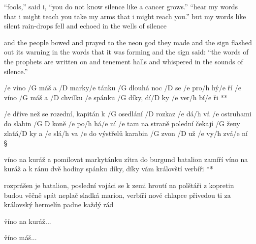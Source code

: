 ``fools,'' said i, ``you do not know
silence like a cancer grows.''
``hear my words that i might teach you
take my arms that i might reach you.''
but my words like silent rain-drops fell
and echoed in the wells of silence \s

and the people bowed and prayed
to the neon god they made
and the sign flashed out its warning
in the words that it was forming
and the sign said: ``the words of the prophets are written on 
and tenement halls
and whispered in the sounds of silence.''




\R  /e víno /G máš a /D marky/e tánku
    /G dlouhá noc /D se /e pro/h hý/e ří
   /e víno /G máš a /D chvilku /e spánku
    /G díky, dí/D ky /e ver/h bí/e ři **

/e dříve než se rozední, kapitán k /G osedlání /D rozkaz /e dá/h vá
/e ostruhami do slabin /{G D} koně /e po/h há/e ní
/e tam na straně polední čekají /G ženy zlaťá/D ky a /e slá/h va
/e do výstřelů karabin /G zvon /D už /e vy/h zvá/e ní \S

\R víno na kuráž a pomilovat markytánku
   zítra do burgund batalion zamíří
   víno na kuráž a k ránu dvě hodiny spánku
   díky, díky vám královští verbíři **

rozprášen je batalion, poslední vojáci se k zemi hroutí
na polštáři z kopretin budou věčně spát
neplač sladká marion, verbíři nové chlapce přivedou ti
za královský hermelín padne každý rád \s

\r víno na kuráž...

\r víno máš...



\bye
